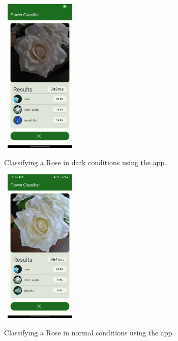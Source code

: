 \documentclass[12pt,a4paper]{report}
\begin{document}
\begin{figure}[h]\
    \includegraphics[width=0.3\textwidth]{rose_light_1.jpg}
    \caption{Classifying a Rose in dark conditions using the app.}
    \label{fig:rose_dark}
\end{figure}

\begin{figure}[h]\
    \includegraphics[width=0.3\textwidth]{rose_light_2.jpg}
    \caption{Classifying a Rose in normal conditions using the app.}
    \label{fig:rose_med}
\end{figure}
\end{document}
